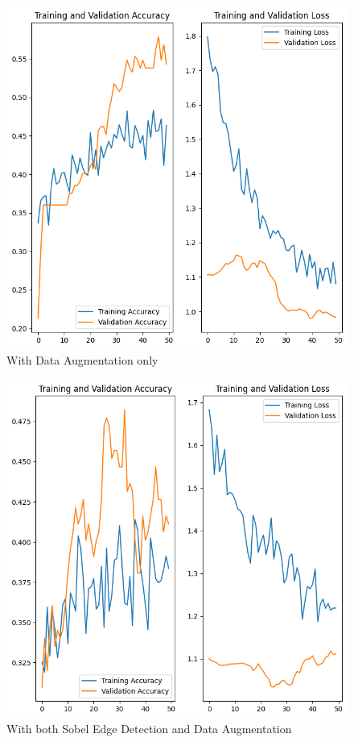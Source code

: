 \begin{figure}[H]
  \includegraphics[width=\linewidth]{figures/with_data_aug.png}
  \caption{With Data Augmentation only}
  \label{fig:data_aug_plots}
\end{figure}

\begin{figure}[H]
  \includegraphics[width=\linewidth]{figures/with_data_aug_and_sobel_edge.png}
  \caption{With both Sobel Edge Detection and Data Augmentation}
  \label{fig:sobel_edge_and_data_aug_plots}
\end{figure}

